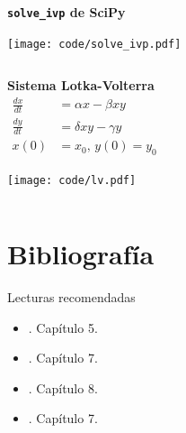 \documentclass[9pt, aspectratio=169]{beamer}
\begin{document}
\begin{frame}[fragile]
\begin{columns}

\begin{center}
    \textbf{\texttt{solve\_ivp} de SciPy}

    \texttt{[image: code/solve\_ivp.pdf]}
\end{center}
\end{columns}
\end{frame}

\begin{frame}[fragile]
\begin{columns}

\begin{center}
    \textbf{Sistema Lotka-Volterra}
    \begin{align*}
        \frac{dx}{dt} &= \alpha x - \beta x y \\
        \frac{dy}{dt} &= \delta x y - \gamma y \\
        x(0) &= x_0, \, y(0) = y_0
    \end{align*}

    \texttt{[image: code/lv.pdf]}
\end{center}
\end{columns}
\end{frame}

\section*{Bibliografía}
\begin{frame}[allowframebreaks]{Lecturas recomendadas}
\begin{itemize}
    \item {}. Capítulo 5.
    \item {}. Capítulo 7.
    \item {}. Capítulo 8.
    \item {}. Capítulo 7.
\end{itemize}
\end{frame}
\end{document}
